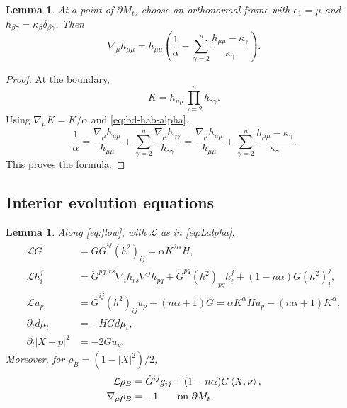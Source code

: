 \documentclass[11pt, reqno]{amsart}
\newtheorem{lemma}[theorem]{Lemma}
\theoremstyle{remark}
\theoremstyle{definition}
\numberwithin{equation}{section}
\newcommand{\cL}{\mathcal L}
\newcommand{\bd}{\partial}
\newcommand{\ip}[2]{\left\langle #1,#2\right\rangle}
\begin{document}
\begin{lemma}\label{lem:dm-hmm-alpha}
At a point of $\partial M_t$, choose an orthonormal frame with $e_1=\mu$ and $h_{\beta\gamma}=\kappa_{\beta}\delta_{\beta\gamma}$. Then
\begin{equation*}
        \nabla_\mu h_{\mu\mu}
        =h_{\mu\mu}\left(\frac{1}{\alpha}-
        \sum_{\gamma=2}^n\frac{h_{\mu\mu}-\kappa_{\gamma}}{\kappa_{\gamma}}\right).
\end{equation*}
\end{lemma}

\begin{proof}
At the boundary,
\begin{equation*}
        K=h_{\mu\mu}\prod_{\gamma=2}^nh_{\gamma\gamma}.
\end{equation*}
Using $\nabla_\mu K=K/\alpha$ and \eqref{eq:bd-hab-alpha},
\begin{equation*}
        \frac1\alpha
        =\frac{\nabla_\mu h_{\mu\mu}}{h_{\mu\mu}}
        +\sum_{\gamma=2}^n\frac{\nabla_\mu h_{\gamma\gamma}}{h_{\gamma\gamma}}
        =\frac{\nabla_\mu h_{\mu\mu}}{h_{\mu\mu}}
        +\sum_{\gamma=2}^n\frac{h_{\mu\mu}-\kappa_\gamma}{\kappa_\gamma}.
\end{equation*}
This proves the formula.
\end{proof}

\subsection{Interior evolution equations}

\begin{lemma}\label{lem:evol-alpha}
Along \eqref{eq:flow}, with $\cL$ as in \eqref{eq:Lalpha},
\begin{align}
        \cL G&=G\dot G^{ij}(h^2)_{ij}=\alpha K^{2\alpha}H,\label{eq:evol-G}\\
        \cL h_i^j&=\ddot G^{pq,rs}\nabla_i h_{rs}\nabla^j h_{pq}
        +\dot G^{pq}(h^2)_{pq}h_i^j+(1-n\alpha)G(h^2)_i^j, \label{eq:hij}\\
        \cL u_p&=\dot G^{ij}(h^2)_{ij}u_p-(n\alpha+1)G
        =\alpha K^\alpha H u_p-(n\alpha+1)K^\alpha,\label{eq:evol-u-alpha}\\
\partial_td\mu_t&= -HGd\mu_t,\label{eq:dmu}\\
        \partial_t|X-p|^2&=-2G u_p.\label{eq:evol-dist-alpha}
\end{align}
Moreover, for $\rho_B=(1-|X|^2)/2$,
\begin{align}
\label{eq:evol-rho-alpha}
        \cL\rho_B&=\dot G^{ij}g_{ij}+(1-n\alpha)G\ip{X}{\nu},\\
\label{eq:bd-rho-alpha}
        \nabla_\mu\rho_B&=-1\qquad\hbox{on }\bd M_t.
\end{align}
\end{lemma}
\end{document}
